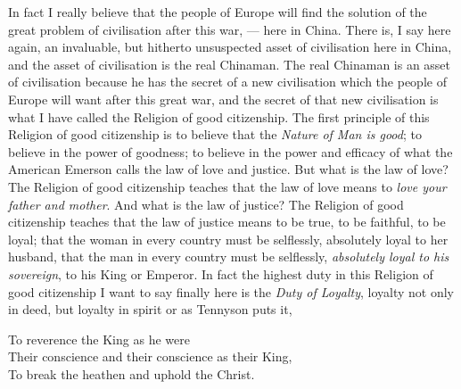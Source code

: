 In fact I really believe that the people of Europe will find the solution of the great problem of civilisation after this war, --- here in China. 
There is, I say here again, an invaluable, but hitherto unsuspected asset of civilisation here in China, and the asset of civilisation is the real Chinaman. 
The real Chinaman is an asset of civilisation because he has the secret of a new civilisation which the people of Europe will want after this great war, and the secret of that new civilisation is what I have called the Religion of good citizenship. 
The first principle of this Religion of good citizenship is to believe that the \emph{Nature of Man is good}; to believe in the power of goodness; to believe in the power and efficacy of what the American Emerson calls the law of love and justice. 
But what is the law of love? The Religion of good citizenship teaches that the law of love means to \emph{love your father and mother}. 
And what is the law of justice? 
The Religion of good citizenship teaches that the law of justice means to be true, to be faithful, to be loyal; that the woman in every country must be selflessly, absolutely loyal to her husband, that the man in every country must be selflessly, \emph{absolutely loyal to his sovereign}, to his King or Emperor. 
In fact the highest duty in this Religion of good citizenship I want to say finally here is the \emph{Duty of Loyalty}, loyalty not only in deed, but loyalty in spirit or as Tennyson puts it,
\begin{center}
    To reverence the King as he were\\
    Their conscience and their conscience as their King,\\
    To break the heathen and uphold the Christ.\\
\end{center}

 
 
   
   
   
